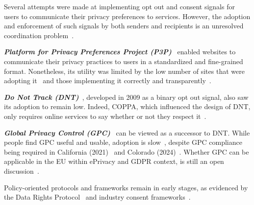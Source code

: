 \label{sec:policy-solutions}
Several attempts were made at implementing opt out and consent signals for users to communicate their privacy preferences to services. However, the adoption and enforcement of such signals by both senders and recipients is an unresolved coordination problem~\cite{hilsPrivacyPreferenceSignals2021}.

\noindent \textbf{\textit{Platform for Privacy Preferences Project (P3P)}}~\cite{reaglePlatformPrivacyPreferences1999,cranorPlatformPrivacyPreferences2002,cranorPlatformPrivacyPreferences2006} enabled websites to communicate their privacy practices to users in a standardized and fine-grained format. Nonetheless, its utility was limited by the low number of sites that were adopting it~\cite{cranorUseP3PUser2002} and those implementing it correctly and transparently~\cite{cranorAnalysisP3PDeployment2003, leonTokenAttemptMisrepresentation2010}.

\noindent \textbf{\textit{Do Not Track (DNT)}}~\cite{fieldingTrackingPreferenceExpression2019}, developed in 2009 as a binary opt out signal, also saw its adoption to remain low. Indeed, COPPA, which influenced the design of DNT, only requires online services to say whether or not they respect it~\cite{CaliforniaCodeBPC2003}.

\noindent \textbf{\textit{Global Privacy Control (GPC)}}~\cite{zimmeckGlobalPrivacyControl2024} can be viewed as a successor to DNT. While people find GPC useful and usable, adoption is slow~\cite{zimmeckUsabilityEnforceabilityGlobal2023,zimmeckGeneralizableActivePrivacy2024}, despite GPC compliance being required in California (2021)~\cite{archive-attorneygeneralbecerra[@agbecerra]CCPARequiresBusinesses2021,bontaAttorneyGeneralBonta2022} and Colorado (2024)~\cite{coloradodepartmentoflawUniversalOptOutShortlist2024}. Whether GPC can be applicable in the EU within ePrivacy and GDPR context, is still an open discussion~\cite{berjonGPCGDPR2021}.

Policy-oriented protocols and frameworks remain in early stages, as evidenced by the Data Rights Protocol~\cite{consumerreportsDataRightsProtocol2024} and industry consent frameworks~\cite{iabtechlabGlobalPrivacyPlatform2024}.
